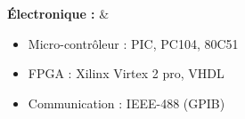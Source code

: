 \textbf{Électronique :}
& \begin{itemize}
    \item Micro-contrôleur : PIC, PC104, 80C51
    \item FPGA : Xilinx Virtex 2 pro, VHDL
    \item Communication : IEEE-488 (GPIB)
\end{itemize} \\

